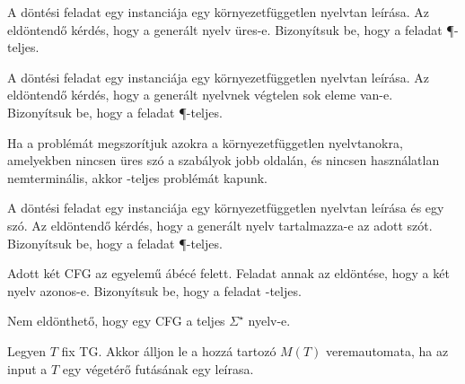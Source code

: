 \begin{Exercise}[counter={sorszam}, difficulty=0]
	A  döntési feladat egy instanciája  egy környezetfüggetlen nyelvtan leírása. Az eldöntendő kérdés, hogy a generált nyelv üres-e. Bizonyítsuk be, hogy a feladat \P-teljes.
\end{Exercise}


\begin{Exercise}[counter={sorszam}, difficulty=0]
	A  döntési feladat egy instanciája egy környezetfüggetlen nyelvtan leírása. Az eldöntendő kérdés, hogy a generált nyelvnek végtelen sok eleme van-e. Bizonyítsuk be, hogy a feladat \P-teljes.
\end{Exercise}


\begin{Exercise}[counter={sorszam}, difficulty=0]
	Ha a  problémát megszorítjuk azokra a környezetfüggetlen nyelvtanokra, amelyekben nincsen üres szó a szabályok jobb oldalán, és nincsen használatlan nemterminális, akkor \NL-teljes problémát kapunk. 
\end{Exercise}


\begin{Exercise}[counter={sorszam}, difficulty=0]
	A  döntési feladat egy instanciája egy környezetfüggetlen nyelvtan leírása és egy szó. Az eldöntendő kérdés, hogy a generált nyelv tartalmazza-e az adott szót. Bizonyítsuk be, hogy a feladat \P-teljes.
\end{Exercise}


\begin{Exercise}[counter={sorszam}, difficulty=0]
	Adott két CFG az egyelemű ábécé felett. Feladat annak az eldöntése, hogy a két nyelv azonos-e. Bizonyítsuk be, hogy a feladat \Sigmatwo-teljes.
\end{Exercise}

\begin{Exercise}[counter={sorszam}, difficulty=1]
	Nem eldönthet\H o, hogy egy CFG a teljes $\Sigma ^ \star$ nyelv-e. 
\end{Exercise}
\begin{Answer}
	Legyen $T$ fix TG. Akkor \'alljon le a hozz\'a tartoz\'o $M(T)$ veremautomata, ha az input a $T$ egy v\'eget\'er\H o fut\'as\'anak egy le\'irasa.
\end{Answer}












